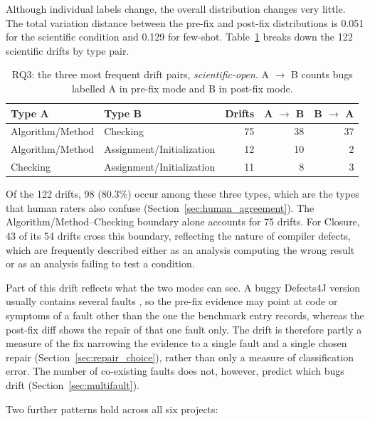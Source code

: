 \documentclass{iutbscthesis}
\begin{document}
Although individual labels change, the overall distribution changes very little. The total variation distance between the pre-fix and post-fix distributions is 0.051 for the scientific condition and 0.129 for few-shot. Table~\ref{tab:rq3_pairs} breaks down the 122 scientific drifts by type pair.

\begin{table}[!htbp]
    \centering
    \small
    \setlength{\tabcolsep}{5pt}
    \begin{tabular}{l l r r r}
        \toprule
        \textbf{Type A} & \textbf{Type B} & \textbf{Drifts} & \textbf{A $\rightarrow$ B} & \textbf{B $\rightarrow$ A} \\
        \midrule
        Algorithm/Method & Checking                  & 75 & 38 & 37 \\
        Algorithm/Method & Assignment/Initialization & 12 & 10 & 2 \\
        Checking         & Assignment/Initialization & 11 & 8  & 3 \\
        \bottomrule
    \end{tabular}
    \caption{RQ3: the three most frequent drift pairs, \textit{scientific-open}. A $\rightarrow$ B counts bugs labelled A in pre-fix mode and B in post-fix mode.}
    \label{tab:rq3_pairs}
\end{table}

Of the 122 drifts, 98 (80.3\%) occur among these three types, which are the types that human raters also confuse (Section~\ref{sec:human_agreement}). The Algorithm/Method--Checking boundary alone accounts for 75 drifts. For Closure, 43 of its 54 drifts cross this boundary, reflecting the nature of compiler defects, which are frequently described either as an analysis computing the wrong result or as an analysis failing to test a condition.

Part of this drift reflects what the two modes can see. A buggy Defects4J version usually contains several faults \cite{callaghan2024mf}, so the pre-fix evidence may point at code or symptoms of a fault other than the one the benchmark entry records, whereas the post-fix diff shows the repair of that one fault only. The drift is therefore partly a measure of the fix narrowing the evidence to a single fault and a single chosen repair (Section~\ref{sec:repair_choice}), rather than only a measure of classification error. The number of co-existing faults does not, however, predict which bugs drift (Section~\ref{sec:multifault}).

Two further patterns hold across all six projects:
\end{document}
